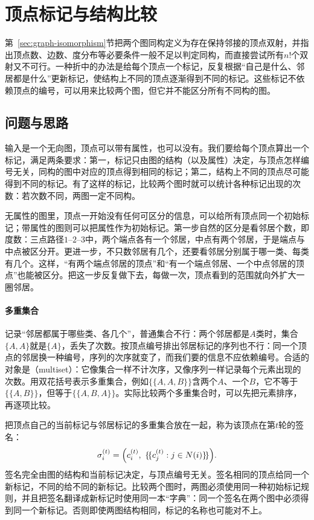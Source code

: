 \section{顶点标记与结构比较}
\label{sec:graph-wl-refinement}

第~\ref{sec:graph-isomorphism}节把两个图同构定义为存在保持邻接的顶点双射，并指出顶点数、边数、度分布等必要条件一般不足以判定同构，而直接尝试所有$n!$个双射又不可行。一种折中的办法是给每个顶点一个标记，反复根据“自己是什么、邻居都是什么”更新标记，使结构上不同的顶点逐渐得到不同的标记。这些标记不依赖顶点的编号，可以用来比较两个图，但它并不能区分所有不同构的图。

\subsection{问题与思路}
\label{sec:graph-trav-neighborhood-labels}

输入是一个无向图，顶点可以带有属性，也可以没有。我们要给每个顶点算出一个标记，满足两条要求：第一，标记只由图的结构（以及属性）决定，与顶点怎样编号无关，同构的图中对应的顶点得到相同的标记；第二，结构上不同的顶点尽可能得到不同的标记。有了这样的标记，比较两个图时就可以统计各种标记出现的次数：若次数不同，两图一定不同构。

无属性的图里，顶点一开始没有任何可区分的信息，可以给所有顶点同一个初始标记；带属性的图则可以把属性作为初始标记。第一步自然的区分是看邻居个数，即度数：三点路径$1\text{--}2\text{--}3$中，两个端点各有一个邻居，中点有两个邻居，于是端点与中点被区分开。更进一步，不只数邻居有几个，还要看邻居分别属于哪一类、每类有几个。这样，“有两个端点邻居的顶点”和“有一个端点邻居、一个中点邻居的顶点”也能被区分。把这一步反复做下去，每做一次，顶点看到的范围就向外扩大一圈邻居。

\paragraph{多重集合}
记录“邻居都属于哪些类、各几个”，普通集合不行：两个邻居都是$A$类时，集合$\{A,A\}$就是$\{A\}$，丢失了次数。按顶点编号排出邻居标记的序列也不行：同一个顶点的邻居换一种编号，序列的次序就变了，而我们要的信息不应依赖编号。合适的对象是（multiset）：它像集合一样不计次序，又像序列一样记录每个元素出现的次数。用双花括号表示多重集合，例如$\{\!\{A,A,B\}\!\}$含两个$A$、一个$B$，它不等于$\{\!\{A,B\}\!\}$，但等于$\{\!\{A,B,A\}\!\}$。实际比较两个多重集合时，可以先把元素排序，再逐项比较。

把顶点自己的当前标记与邻居标记的多重集合放在一起，称为该顶点在第$t$轮的签名：
\[
\sigma_i^{(t)}=\Bigl(c_i^{(t)},\ \{\!\{c_j^{(t)}:j\in N(i)\}\!\}\Bigr).
\]
签名完全由图的结构和当前标记决定，与顶点编号无关。签名相同的顶点给同一个新标记，不同的给不同的新标记。比较两个图时，两图必须使用同一种初始标记规则，并且把签名翻译成新标记时使用同一本“字典”：同一个签名在两个图中必须得到同一个新标记。否则即使两图结构相同，标记的名称也可能对不上。

